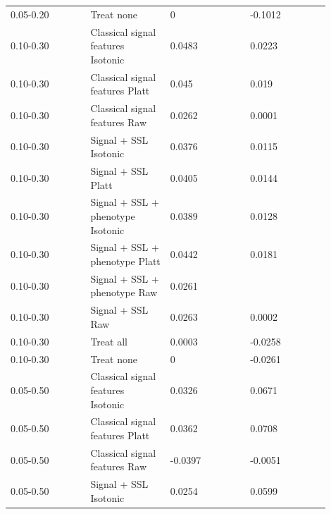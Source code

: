\documentclass[11pt]{article}
\begin{document}
\begin{landscape}
\begin{longtable}{L{0.225\linewidth} L{0.225\linewidth} L{0.225\linewidth} L{0.225\linewidth}}
0.\allowbreak{}05-\allowbreak{}0.\allowbreak{}20 & Treat none & 0 & -\allowbreak{}0.\allowbreak{}1012 \\
0.\allowbreak{}10-\allowbreak{}0.\allowbreak{}30 & Classical signal features Isotonic & 0.\allowbreak{}0483 & 0.\allowbreak{}0223 \\
0.\allowbreak{}10-\allowbreak{}0.\allowbreak{}30 & Classical signal features Platt & 0.\allowbreak{}045 & 0.\allowbreak{}019 \\
0.\allowbreak{}10-\allowbreak{}0.\allowbreak{}30 & Classical signal features Raw & 0.\allowbreak{}0262 & 0.\allowbreak{}0001 \\
0.\allowbreak{}10-\allowbreak{}0.\allowbreak{}30 & Signal + SSL Isotonic & 0.\allowbreak{}0376 & 0.\allowbreak{}0115 \\
0.\allowbreak{}10-\allowbreak{}0.\allowbreak{}30 & Signal + SSL Platt & 0.\allowbreak{}0405 & 0.\allowbreak{}0144 \\
0.\allowbreak{}10-\allowbreak{}0.\allowbreak{}30 & Signal + SSL + phenotype Isotonic & 0.\allowbreak{}0389 & 0.\allowbreak{}0128 \\
0.\allowbreak{}10-\allowbreak{}0.\allowbreak{}30 & Signal + SSL + phenotype Platt & 0.\allowbreak{}0442 & 0.\allowbreak{}0181 \\
0.\allowbreak{}10-\allowbreak{}0.\allowbreak{}30 & Signal + SSL + phenotype Raw & 0.\allowbreak{}0261 &  \\
0.\allowbreak{}10-\allowbreak{}0.\allowbreak{}30 & Signal + SSL Raw & 0.\allowbreak{}0263 & 0.\allowbreak{}0002 \\
0.\allowbreak{}10-\allowbreak{}0.\allowbreak{}30 & Treat all & 0.\allowbreak{}0003 & -\allowbreak{}0.\allowbreak{}0258 \\
0.\allowbreak{}10-\allowbreak{}0.\allowbreak{}30 & Treat none & 0 & -\allowbreak{}0.\allowbreak{}0261 \\
0.\allowbreak{}05-\allowbreak{}0.\allowbreak{}50 & Classical signal features Isotonic & 0.\allowbreak{}0326 & 0.\allowbreak{}0671 \\
0.\allowbreak{}05-\allowbreak{}0.\allowbreak{}50 & Classical signal features Platt & 0.\allowbreak{}0362 & 0.\allowbreak{}0708 \\
0.\allowbreak{}05-\allowbreak{}0.\allowbreak{}50 & Classical signal features Raw & -\allowbreak{}0.\allowbreak{}0397 & -\allowbreak{}0.\allowbreak{}0051 \\
0.\allowbreak{}05-\allowbreak{}0.\allowbreak{}50 & Signal + SSL Isotonic & 0.\allowbreak{}0254 & 0.\allowbreak{}0599 \\

\end{longtable}
\end{landscape}
\end{document}
